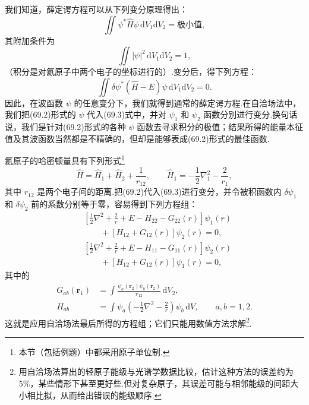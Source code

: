 我们知道，薛定谔方程可以从下列变分原理得出：
\begin{equation*}
  \iint\psi^{*}\hat{H}\psi\,\mathrm{d}V_1\mathrm{d}V_2=\text{极小值},
\end{equation*}
其附加条件为
\begin{equation*}
  \iint|\psi|^{2}\,\mathrm{d}V_1\mathrm{d}V_2=1,
\end{equation*}
（积分是对氦原子中两个电子的坐标进行的）.变分后，得下列方程：
\begin{equation}
  \iint\delta\psi^{*}(\hat{H}-E)\psi\,\mathrm{d}V_1\mathrm{d}V_2=0.
\end{equation}
因此，在波函数 $\psi$ 的任意变分下，我们就得到通常的薛定谔方程.在自洽场法中，我们把(69.2)形式的 $\psi$ 代入(69.3)式中，并对 $\psi_1$ 和 $\psi_2$ 函数分别进行变分.换句话说，我们是针对(69.2)形式的各种 $\psi$ 函数去寻求积分的极值；结果所得的能量本征值及其波函数当然都是不精确的，但却是能够表成(69.2)形式的最佳函数.

氦原子的哈密顿量具有下列形式\footnote{本节（包括例题）中都采用原子单位制.}
\begin{equation}
  \hat{H}=\hat{H}_1+\hat{H}_2+\frac{1}{r_{12}},\qquad
  \hat{H}_1=-\frac{1}{2}\nabla_1^{2}-\frac{2}{r_1},
\end{equation}
其中 $r_{12}$ 是两个电子间的距离.把(69.2)代入(69.3)进行变分，并令被积函数内 $\delta\psi_1$ 和 $\delta\psi_2$ 前的系数分别等于零，容易得到下列方程组：
\begin{equation}
\begin{aligned}
  &\left[\frac{1}{2}\nabla^{2}+\frac{2}{r}+E-H_{22}-G_{22}(r)\right]\psi_1(r)\\
  &\qquad+\left[H_{12}+G_{12}(r)\right]\psi_2(r)=0,\\
  &\left[\frac{1}{2}\nabla^{2}+\frac{2}{r}+E-H_{11}-G_{11}(r)\right]\psi_2(r)\\
  &\qquad+\left[H_{12}+G_{12}(r)\right]\psi_1(r)=0,
\end{aligned}
\end{equation}
其中的
\begin{equation}
\begin{aligned}
  G_{ab}(\boldsymbol{r}_1)&=\int\frac{\psi_a(\boldsymbol{r}_2)\psi_b(\boldsymbol{r}_2)}{r_{12}}\,\mathrm{d}V_2,\\
  H_{ab}&=\int\psi_a\left(-\frac{1}{2}\nabla^{2}-\frac{2}{r}\right)\psi_b\,\mathrm{d}V,
  \qquad a,b=1,2.
\end{aligned}
\end{equation}
这就是应用自洽场法最后所得的方程组；它们只能用数值方法求解\footnote{用自洽场法算出的轻原子能级与光谱学数据比较，估计这种方法的误差约为 5\%，某些情形下甚至更好些.但对复杂原子，其误差可能与相邻能级的间距大小相比拟，从而给出错误的能级顺序.}.

